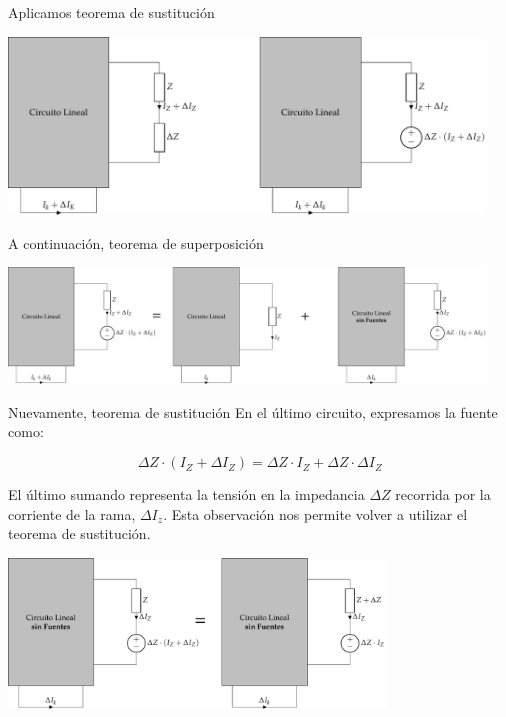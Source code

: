\documentclass[aspectratio=169, usenames,svgnames,dvipsnames]{beamer}
\begin{document}
\begin{frame}[label={sec:orgd0ae41e}]{Aplicamos teorema de sustitución}
\begin{center}
\includegraphics[width=0.95\textwidth]{../figs/TeoremaCompensacion1.pdf}
\end{center}
\end{frame}

\begin{frame}[label={sec:orgc65ad0d}]{A continuación, teorema de superposición}
\begin{center}
\includegraphics[width=0.95\textwidth]{../figs/TeoremaCompensacion2.pdf}
\end{center}
\end{frame}

\begin{frame}[label={sec:orgfec181a}]{Nuevamente, teorema de sustitución}
En el último circuito, expresamos la fuente como:

\[
  \Delta Z \cdot (I_Z + \Delta I_Z) = \Delta Z \cdot I_Z + \Delta Z \cdot \Delta I_Z
\]

El último sumando representa la tensión en la impedancia \(\Delta Z\) recorrida por la corriente de la rama, \(\Delta I_z\). Esta observación nos permite volver a utilizar el teorema de sustitución.


\begin{center}
\includegraphics[width=0.75\textwidth]{../figs/TeoremaCompensacion3.pdf}
\end{center}
\end{frame}
\end{document}

